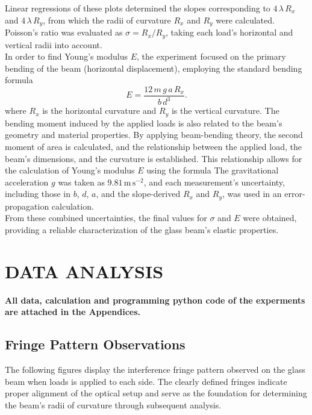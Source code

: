 \documentclass[a4paper,11pt]{article}
\begin{document}
Linear regressions of these plots determined the slopes corresponding to \(4\,\lambda\,R_x\) and \(4\,\lambda\,R_y\), from which the radii of curvature \(R_x\) and \(R_y\) were calculated. Poisson's ratio was evaluated as \(\sigma = R_x / R_y\), taking each load's horizontal and vertical radii into account.\\

In order to find Young's modulus \(E\), the experiment focused on the primary bending of the beam (horizontal displacement), employing the standard bending formula 
\begin{equation}
E = \frac{12\,m\,g\,a\,R_x}{b\,d^3}.
\end{equation}
where \(R_x\) is the horizontal curvature and \(R_y\) is the vertical curvature. The bending moment induced by the applied loads is also related to the beam's geometry and material properties. By applying beam-bending theory, the second moment of area is calculated, and the relationship between the applied load, the beam's dimensions, and the curvature is established. This relationship allows for the calculation of Young's modulus \(E\) using the formula
The gravitational acceleration \(g\) was taken as \(9.81\,\mathrm{m\,s}^{-2}\), and each measurement's uncertainty, including those in \(b\), \(d\), \(a\), and the slope-derived \(R_x\) and \(R_y\), was used in an error-propagation calculation.\\

From these combined uncertainties, the final values for \(\sigma\) and \(E\) were obtained, providing a reliable characterization of the glass beam's elastic properties.

\newpage
\section{\centering DATA ANALYSIS}
\label{sec:DATA ANALYSIS}
\textbf{All data, calculation and programming python code of the experments are attached in the Appendices.}\\

\subsection{Fringe Pattern Observations}
\label{subsec:FRINGE PATTERN}
\noindent 

The following figures display the interference fringe pattern observed on the glass beam when loads is applied to each side. The clearly defined fringes indicate proper alignment of the optical setup and serve as the foundation for determining the beam's radii of curvature through subsequent analysis.\\
\end{document}

